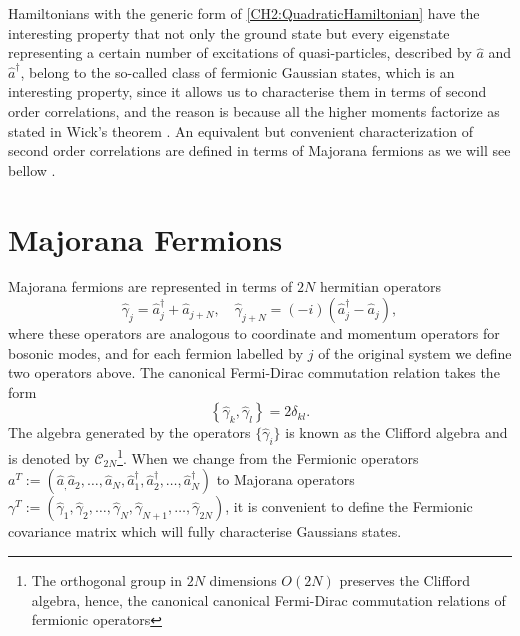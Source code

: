 \indent Hamiltonians with the generic form of \eqref{CH2:QuadraticHamiltonian} have the interesting property that not only the ground state but every eigenstate representing a certain number of excitations of quasi-particles, described by $\hat{a}$ and $\hat{a}^{\dagger}$, belong to the so-called class of fermionic Gaussian states, which is an interesting property, since it allows us to characterise them in terms of second order correlations, and the reason is because all the higher moments factorize as stated in Wick’s theorem \cite{westwanski_general_1973, molinari_notes_2017}. An equivalent but convenient characterization of second order correlations are defined in terms of Majorana fermions as we will see bellow .

\section{Majorana Fermions}
Majorana fermions are represented in terms of $2N$ hermitian operators 
\begin{equation}
\hat{\gamma}_{j}=\hat{a}_{j}^{\dagger}+\hat{a}_{j+N}, \quad \hat{\gamma}_{j+N}=(-i)\left(\hat{a}_{j}^{\dagger}-\hat{a}_{j}\right),
\label{CH2:majorana}
\end{equation}
where these operators are analogous to coordinate and momentum operators for bosonic modes, and for each fermion labelled by $j$ of the original system we define two operators above. The canonical Fermi-Dirac commutation relation takes the form
\begin{equation}
\left\{\hat{\gamma}_{k},\hat{\gamma}_{l}\right\}=2 \delta_{k l}.
\label{CH2:CAR_majorana}
\end{equation}
The algebra generated by the operators $\{\hat{\gamma}_i\}$ is known as the Clifford algebra and is denoted by $\mathcal{C}_{2N}$\footnote{The orthogonal group in $2N$ dimensions $O(2N)$ preserves the Clifford algebra, hence, the canonical  canonical Fermi-Dirac commutation relations of fermionic operators}. When we change from the Fermionic operators $a^{T}:=(\hat{a}_,\hat{a}_2,\ldots,\hat{a}_N, \hat{a}^{\dagger}_1,\hat{a}^{\dagger}_2,\ldots,\hat{a}^{\dagger}_N)$ to Majorana operators $\gamma^{T}:=(\hat{\gamma}_1,\hat{\gamma}_2,\ldots, \hat{\gamma}_N,\hat{\gamma}_{N+1},\ldots,\hat{\gamma}_{2N})$, it is convenient to define the Fermionic covariance matrix which will fully characterise Gaussians states.  

